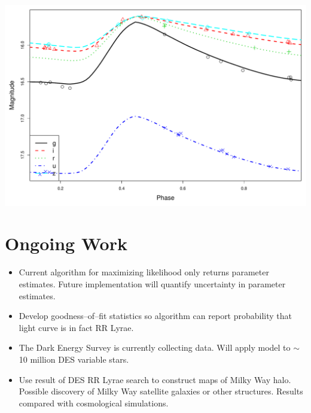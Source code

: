\documentclass[a0,portrait]{a0poster}
\begin{document}
\begin{multicols}{2}
\begin{itemize}
\begin{center}\vspace{1cm}
\includegraphics[width=0.7\linewidth]{2_one.pdf}
\end{center}\vspace{1cm}



\end{itemize}

\section*{Ongoing Work}

\begin{itemize}
\item Current algorithm for maximizing likelihood only returns parameter estimates. Future implementation will quantify uncertainty in parameter estimates.
\item Develop goodness--of--fit statistics so algorithm can report probability that light curve is in fact RR Lyrae.
\item The Dark Energy Survey is currently collecting data. Will apply model to $\sim$ 10 million DES variable stars.
\item Use result of DES RR Lyrae search to construct maps of Milky Way halo. Possible discovery of Milky Way satellite galaxies or other structures. Results compared with cosmological simulations.
\end{itemize}






\nocite{*} %


\end{multicols}
\end{document}
